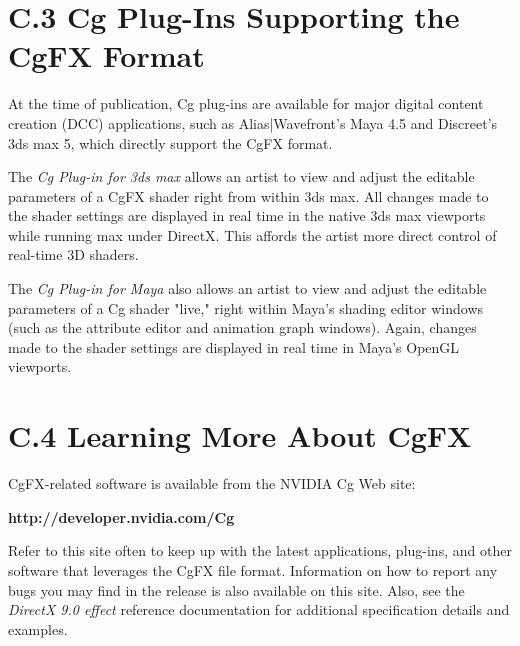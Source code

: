 \documentclass[../main.tex]{subfiles}
\begin{document}
\section{C.3 Cg Plug-Ins Supporting the CgFX Format}

At the time of publication, Cg plug-ins are available for major digital content creation (DCC) applications, such as Alias|Wavefront's Maya 4.5 and Discreet's 3ds max 5, which directly support the CgFX format.

The \textit{Cg Plug-in for 3ds max} allows an artist to view and adjust the editable parameters of a CgFX shader right from within 3ds max. All changes made to the shader settings are displayed in real time in the native 3ds max viewports while running max under DirectX. This affords the artist more direct control of real-time 3D shaders.

The \textit{Cg Plug-in for Maya} also allows an artist to view and adjust the editable parameters of a Cg shader "live," right within Maya's shading editor windows (such as the attribute editor and animation graph windows). Again, changes made to the shader settings are displayed in real time in Maya's OpenGL viewports.

\section{C.4 Learning More About CgFX}

CgFX-related software is available from the NVIDIA Cg Web site:

\textbf{http://developer.nvidia.com/Cg}

Refer to this site often to keep up with the latest applications, plug-ins, and other software that leverages the CgFX file format. Information on how to report any bugs you may find in the release is also available on this site. Also, see the \textit{DirectX 9.0 effect} reference documentation for additional specification details and examples.
\end{document}
